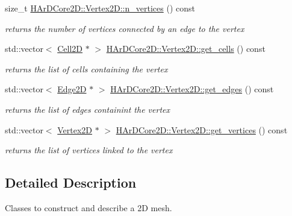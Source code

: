 \begin{DoxyCompactItemize}
\mbox{\label{group__Mesh2D_gad7125cc3da51d21e712498a29901860b}} 
size\+\_\+t \hyperlink{group__Mesh2D_gad7125cc3da51d21e712498a29901860b}{H\+Ar\+D\+Core2\+D\+::\+Vertex2\+D\+::n\+\_\+vertices} () const
\begin{DoxyCompactList}\small\item\em returns the number of vertices connected by an edge to the vertex \end{DoxyCompactList}\item 
\mbox{\label{group__Mesh2D_ga73dce5f9bfbdfda7631e04f062f2df79}} 
std\+::vector$<$ \hyperlink{classHArDCore2D_1_1Cell2D}{Cell2D} $\ast$ $>$ \hyperlink{group__Mesh2D_ga73dce5f9bfbdfda7631e04f062f2df79}{H\+Ar\+D\+Core2\+D\+::\+Vertex2\+D\+::get\+\_\+cells} () const
\begin{DoxyCompactList}\small\item\em returns the list of cells containing the vertex \end{DoxyCompactList}\item 
\mbox{\label{group__Mesh2D_ga652502483daf80fd18557f6a80e499ca}} 
std\+::vector$<$ \hyperlink{classHArDCore2D_1_1Edge2D}{Edge2D} $\ast$ $>$ \hyperlink{group__Mesh2D_ga652502483daf80fd18557f6a80e499ca}{H\+Ar\+D\+Core2\+D\+::\+Vertex2\+D\+::get\+\_\+edges} () const
\begin{DoxyCompactList}\small\item\em returns the list of edges containint the vertex \end{DoxyCompactList}\item 
\mbox{\label{group__Mesh2D_ga05a3eb80e579fce25ddd3f423adac1a4}} 
std\+::vector$<$ \hyperlink{classHArDCore2D_1_1Vertex2D}{Vertex2D} $\ast$ $>$ \hyperlink{group__Mesh2D_ga05a3eb80e579fce25ddd3f423adac1a4}{H\+Ar\+D\+Core2\+D\+::\+Vertex2\+D\+::get\+\_\+vertices} () const
\begin{DoxyCompactList}\small\item\em returns the list of vertices linked to the vertex \end{DoxyCompactList}\end{DoxyCompactItemize}


\subsection{Detailed Description}
Classes to construct and describe a 2D mesh. 

